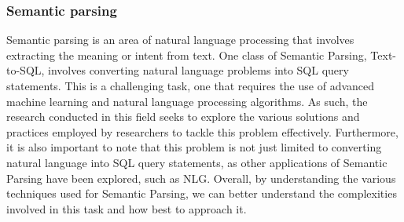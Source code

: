 \subsubsection{Semantic parsing}

Semantic parsing\cite{krishnamurthy-etal-2017-neural} is an area of natural language processing that involves extracting the meaning or intent from text. One class of Semantic Parsing, Text-to-SQL, involves converting natural language problems into SQL query statements. This is a challenging task, one that requires the use of advanced machine learning and natural language processing algorithms. As such, the research conducted in this field seeks to explore the various solutions and practices employed by researchers to tackle this problem effectively. Furthermore, it is also important to note that this problem is not just limited to converting natural language into SQL query statements, as other applications of Semantic Parsing have been explored, such as \ac{NLG}. Overall, by understanding the various techniques used for Semantic Parsing, we can better understand the complexities involved in this task and how best to approach it.
